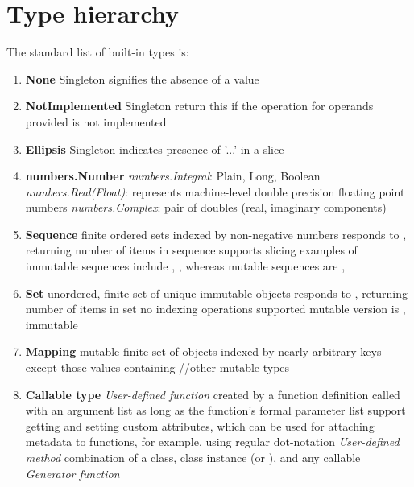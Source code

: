 \documentclass{icldt}
\numberwithin{equation}{section}       %
\begin{document}
{{\chapter{Type hierarchy}
\label{appendix:type-hierarchy}
The standard list of built-in types is:
\begin{enumerate}
	\item \textbf{None}
		\subitem Singleton
		\subitem signifies the absence of a value
	\item \textbf{NotImplemented}
		\subitem Singleton
		\subitem return this if the operation for operands provided is not implemented
	\item \textbf{Ellipsis}
		\subitem Singleton
		\subitem indicates presence of '...' in a slice
	\item \textbf{numbers.Number}
		\subitem \emph{numbers.Integral}: Plain, Long, Boolean
		\subitem \emph{numbers.Real(Float)}: represents machine-level double precision floating point numbers
		\subitem \emph{numbers.Complex}: pair of doubles (real, imaginary components)
	\item \textbf{Sequence}
		\subitem finite ordered sets indexed by non-negative numbers
		\subitem responds to , returning number of items in sequence
		\subitem supports slicing
		\subitem examples of immutable sequences include , , 
		\subitem whereas mutable sequences are , 
	\item \textbf{Set}
		\subitem unordered, finite set of unique immutable objects
		\subitem responds to , returning number of items in set
		\subitem no indexing operations supported
		\subitem mutable version is , immutable 
	\item \textbf{Mapping}
		\subitem {}
			\subsubitem mutable
			\subsubitem finite set of objects
			\subsubitem indexed by nearly arbitrary keys
			\subsubitem except those values containing //other mutable types
	\item \textbf{Callable type}
		\subitem \emph{User-defined function}
			\subsubitem created by a function definition
			\subsubitem called with an argument list as long as the function's formal parameter list
			\subsubitem support getting and setting custom attributes, which can be used for attaching metadata to functions, for example, using regular dot-notation			
		\subitem \emph{User-defined method}
			\subsubitem combination of a class, class instance (or ), and any callable
		\subitem \emph{Generator function}

\end{enumerate}}}
\end{document}
